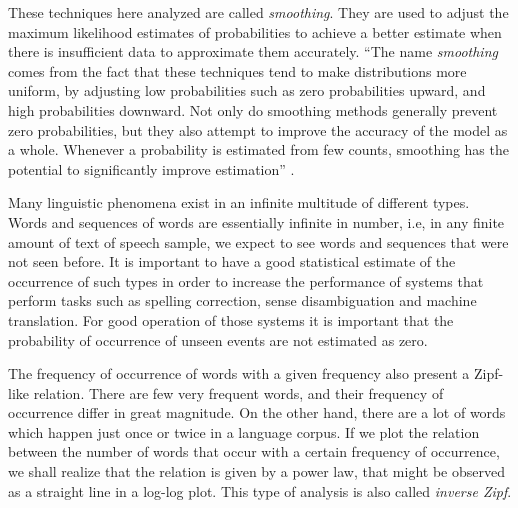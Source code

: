 These techniques here analyzed are called \emph{smoothing}. They are used to adjust the maximum 
likelihood estimates of probabilities to achieve a better estimate when there is insufficient data to 
approximate them accurately. ``The name \emph{smoothing} comes from the fact that these techniques
tend to make distributions more uniform, by adjusting low probabilities such as zero probabilities
upward, and high probabilities downward. Not only do smoothing methods generally prevent zero
probabilities, but they also attempt to improve the accuracy of the model as a whole. Whenever
a probability is estimated from few counts, smoothing has the potential to significantly improve
estimation'' \citep{chen98}.
 


Many linguistic phenomena exist in an infinite multitude of different types. Words and sequences of words
are essentially infinite in number, i.e, in any finite amount of text of speech sample, we expect
to see words and sequences that were not seen before. It is important to have a good statistical estimate
of the occurrence of such types in order to increase the performance of systems that perform tasks such as 
spelling correction, sense disambiguation and machine translation. For good operation of those systems 
it is important that the probability of occurrence of unseen events are not estimated as zero.

The frequency of occurrence of words with a given frequency also present a Zipf-like relation.
There are few very frequent words, and their frequency of occurrence differ in great magnitude.
On the other hand, there are a lot of words which happen just once or twice in a language corpus.
If we plot the relation between the number of words that occur with a certain frequency
of occurrence, we shall realize that the relation is given by a power law, that might be 
observed as a straight line in a log-log plot. This type of analysis is also called 
\textit{inverse Zipf}.


